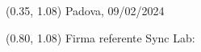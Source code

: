 \documentclass{article}
\begin{document}
    \pagebreak 


\begin{textblock*}{\textwidth}(0.35\textwidth, 1.08\textheight)
    Padova, 09/02/2024
\end{textblock*}

\begin{textblock*}{\textwidth}(0.80\textwidth, 1.08\textheight)
        Firma referente Sync Lab:
\end{textblock*}
\end{document}
